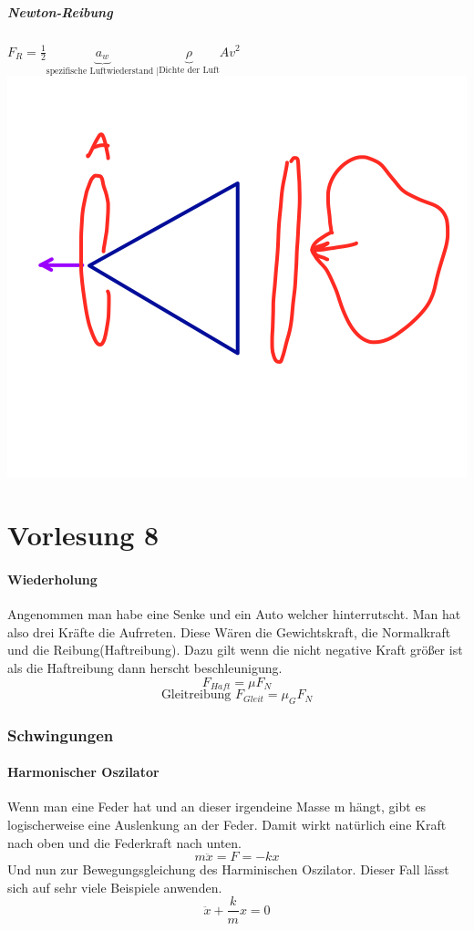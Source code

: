 \documentclass[11pt]{article}
\begin{document}
		\subsubsection{Newton-Reibung}
			$ F_R = \frac{1}{2} \underbrace{a_w}_{\text{spezifische Luftwiederstand |}}  \underbrace{\rho}_{\text{Dichte der Luft}} A v^2 $
			\includegraphics[scale=0.3]{IMG_7A852B76F915-1.jpeg}
		\part{Vorlesung 8}
			\subsection{Wiederholung}
				Angenommen man habe eine Senke und ein Auto welcher hinterrutscht. Man hat also drei Kräfte die Aufrreten. Diese Wären die Gewichtskraft, die Normalkraft und die Reibung(Haftreibung). Dazu gilt wenn die nicht negative Kraft größer ist als die Haftreibung dann herscht beschleunigung.
				\[ F_{Haft} = \mu F_N \]
				\[ \text{Gleitreibung } F_{Gleit} = \mu_G F_N \]
		\section{Schwingungen}
			\subsection{Harmonischer Oszilator}
				Wenn man eine Feder hat und an dieser irgendeine Masse m hängt, gibt es logischerweise eine Auslenkung an der Feder. Damit wirkt natürlich eine Kraft nach oben und die Federkraft nach unten.
				\[ m \ddot{x} = F = - kx  \]
			Und nun zur Bewegungsgleichung des Harminischen Oszilator. Dieser Fall lässt sich auf sehr viele Beispiele  anwenden. 
			\[ \ddot{x} + \frac{k}{m}x = 0 \]
\end{document}

